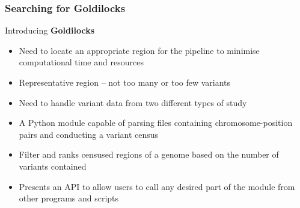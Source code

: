 \documentclass{beamer}
\begin{document}
\begin{frame}[t]
\frametitle{Searching for Goldilocks}
    \begin{beamerboxesrounded}[shadow=true]{}
        \begin{center}
            Introducing \textbf{Goldilocks}
        \end{center}
    \end{beamerboxesrounded}
    \begin{itemize}
        \item Need to locate an appropriate region for the pipeline to minimise
            computational time and resources
        \item Representative region -- not too many or too few variants
        \item Need to handle variant data from two different types of study
        \item A Python module capable of parsing files containing chromosome-position
            pairs and conducting a variant census
        \item Filter and ranks censused regions of a genome based on the number of
            variants contained
        \item Presents an API to allow users to call any desired part of the module
            from other programs and scripts
    \end{itemize}
\end{frame}
\end{document}
